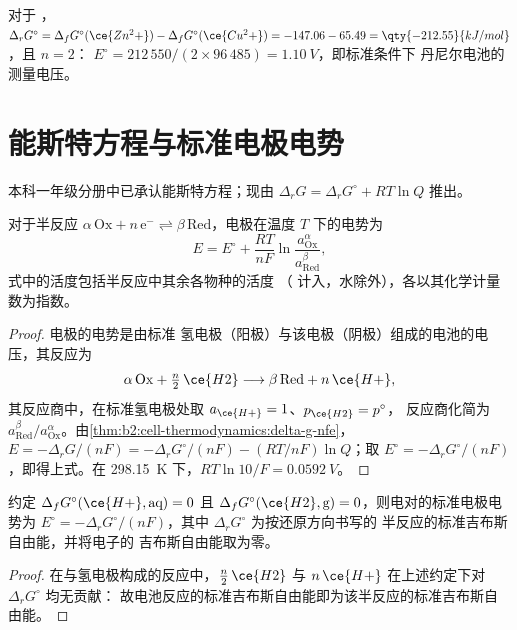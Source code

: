 \begin{example}[丹尼尔电池]\label{ex:b2:cell-thermodynamics:daniell}
对于 ，$\Delta_r G^\circ = \Delta_f G^\circ(\ce{Zn^2+}) -
\Delta_f G^\circ(\ce{Cu^2+}) = -147.06 - 65.49 = \qty{-212.55}{kJ/mol}$，且 $n = 2$：
$E^\circ = 212\,550/(2 \times 96\,485) = \qty{1.10}{V}$，即标准条件下
丹尼尔电池的测量电压。
\end{example}

\section{能斯特方程与标准电极电势}

本科一年级分册中已承认能斯特方程；现由
$\Delta_r G = \Delta_r G^\circ + RT\ln Q$ 推出。

\begin{theorem}[能斯特方程的推导]\label{thm:b2:cell-thermodynamics:nernst-derived}
对于半反应 $\alpha\,\mathrm{Ox} + n\,\mathrm e^- \rightleftharpoons
\beta\,\mathrm{Red}$，电极在温度 $T$ 下的电势为
\[
  E = E^\circ + \frac{RT}{nF}\ln\frac{a_{\mathrm{Ox}}^{\alpha}}{a_{\mathrm{Red}}^{\beta}} ,
\]
式中的活度包括半反应中其余各物种的活度
（ 计入，水除外），各以其化学计量数为指数。
\end{theorem}

\begin{proof}
电极的电势是由标准
氢电极（阳极）与该电极（阴极）组成的电池的电压，其反应为
\[
  \alpha\,\mathrm{Ox} + \tfrac n2\,\ce{H2} \longrightarrow \beta\,\mathrm{Red} + n\,\ce{H+} ,
\]
其反应商中，在标准氢电极处取 $a_{\ce{H+}} = 1$、$p_{\ce{H2}} = p^\circ$，
反应商化简为 $a_{\mathrm{Red}}^\beta/
a_{\mathrm{Ox}}^\alpha$。由\cref{thm:b2:cell-thermodynamics:delta-g-nfe}，
$E = -\Delta_r G/(nF) = -\Delta_r G^\circ/(nF) - (RT/nF)\ln Q$；取 $E^\circ =
-\Delta_r G^\circ/(nF)$，即得上式。在 \qty{298.15}{K} 下，$RT\ln 10/F =
\qty{0.0592}{V}$。
\end{proof}

\begin{proposition}[由吉布斯自由能求标准电极电势]\label{prop:b2:cell-thermodynamics:standard-potential}
约定 $\Delta_f G^\circ(\ce{H+}, \text{aq}) = 0$ 且
$\Delta_f G^\circ(\ce{H2}, \text{g}) = 0$，则电对的标准电极电势为
$E^\circ = -\Delta_r G^\circ/(nF)$，其中 $\Delta_r G^\circ$ 为按还原方向书写的
半反应的标准吉布斯自由能，并将电子的
吉布斯自由能取为零。
\end{proposition}

\begin{proof}
在与氢电极构成的反应中，$\tfrac n2\,\ce{H2}$ 与
$n\,\ce{H+}$ 在上述约定下对 $\Delta_r G^\circ$ 均无贡献：
故电池反应的标准吉布斯自由能即为该半反应的标准吉布斯自由能。
\end{proof}

